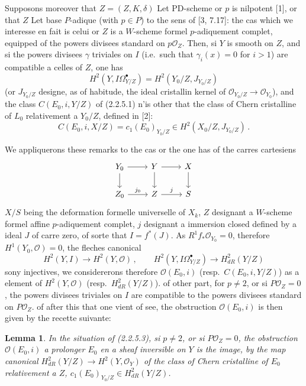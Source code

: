 \documentclass[12pt,a4paper]{article}
\theoremstyle{plain}
\newtheorem{lemma}[theorem]{Lemma}
\theoremstyle{definition}
\theoremstyle{remark}
\begin{document}
Supposons moreover that $Z = (Z, K, \delta)$ Let PD-scheme or $p$ is nilpotent [1], or that $Z$ Let base $P$-adique (with $p \in P$) to the sens of [3, 7.17]: the cas which we interesse en fait is celui or $Z$ is a $W$-scheme formel $p$-adiquement complet, equipped of the powers divisees standard on $p\mathcal{O}_Z$. Then, si $Y$ is smooth on $Z$, and si the powers divisees $\gamma$ triviales on $I$ (i.e.\ such that $\gamma_i(x) = 0$ for $i > 1$) are compatible a celles of $Z$, one has
\[
H^2(Y, I\Omega_{Y/Z}^\bullet) = H^2(Y_0/Z, J_{Y_0/Z})
\]
(or $J_{Y_0/Z}$ designe, as of habitude, the ideal cristallin kernel of $\mathcal{O}_{Y_0/Z} \to \mathcal{O}_{Y_0}$), and the class $C(E_0, i, Y/Z)$ of (2.2.5.1) n'is other that the class of Chern cristalline of $L_0$ relativement a $Y_0/Z$, defined in [2]:
\begin{equation}\label{eq:2.2.5.2}
C(E_0, i, X/Z) = c_1(E_0)_{Y_0/Z} \in H^2(X_0/Z, J_{Y_0/Z})\,.\end{equation}

We appliquerons these remarks to the cas or the one has of the carres cartesiens
\begin{equation}\label{eq:2.2.5.3}
\begin{tikzcd}
Y_0 \rar \dar & Y \rar \dar & X \dar \\
Z_0 \rar{j_0} & Z \rar{j} & S
\end{tikzcd}
\end{equation}
$X/S$ being the deformation formelle universelle of $X_k$, $Z$ designant a $W$-scheme formel affine $p$-adiquement complet, $j$ designant a immersion closed defined by a ideal $J$ of carre zero, of sorte that $I = f^*(J)$. As $R^1f_*\mathcal{O}_{Y_0} = 0$, therefore $H^1(Y_0, \mathcal{O}) = 0$, the fleches canonical
\[
H^2(Y, I) \longrightarrow H^2(Y, \mathcal{O})\,, \qquad H^2(Y, I\Omega_{Y/Z}^\bullet) \longrightarrow H_{dR}^2(Y/Z)
\]
sony injectives, we considererons therefore $\mathcal{O}(E_0, i)$ (resp.\ $C(E_0, i, Y/Z)$) as a element of $H^2(Y, \mathcal{O})$ (resp.\ $H_{dR}^2(Y/Z)$). of other part, for $p \neq 2$, or si $P\mathcal{O}_Z = 0$, the powers divisees triviales on $I$ are compatible to the powers divisees standard on $P\mathcal{O}_Z$. of after this that one vient of see, the obstruction $\mathcal{O}(E_0, i)$ is then given by the recette suivante:

\begin{lemma}\label{lem:2.2.6}
In the situation of (2.2.5.3), si $p \neq 2$, or si $P\mathcal{O}_Z = 0$, the obstruction $\mathcal{O}(E_0, i)$ a prolonger $E_0$ en a sheaf inversible on $Y$ is the image, by the map canonical $H_{dR}^2(Y/Z) \to H^2(Y, \mathcal{O}_Y)$ of the class of Chern cristalline of $E_0$ relativement a $Z$, $c_1(E_0)_{Y_0/Z} \in H_{dR}^2(Y/Z)$.
\end{lemma}
\end{document}
